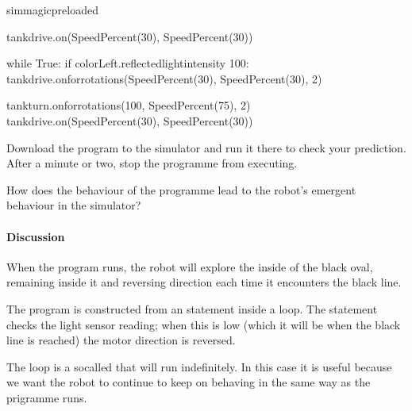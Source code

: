 \documentclass[letterpaper,10pt,english]{sphinxmanual}
\begin{document}

{
\begin{sphinxVerbatim}[commandchars=\\\{\}]
\llap{\color{nbsphinxin}[ ]:\,\hspace{\fboxrule}\hspace{\fboxsep}}\PYGZpc{}\PYGZpc{}sim\PYGZus{}magic\PYGZus{}preloaded

tank\PYGZus{}drive.on(SpeedPercent(30), SpeedPercent(30))

while True:
    if colorLeft.reflected\PYGZus{}light\PYGZus{}intensity \PYGZlt{} 100:
        tank\PYGZus{}drive.on\PYGZus{}for\PYGZus{}rotations(SpeedPercent(\PYGZhy{}30),
                                    SpeedPercent(\PYGZhy{}30), 2)

        tank\PYGZus{}turn.on\PYGZus{}for\PYGZus{}rotations(\PYGZhy{}100, SpeedPercent(75), 2)
        tank\PYGZus{}drive.on(SpeedPercent(30), SpeedPercent(30))

\end{sphinxVerbatim}
}

Download the program to the simulator and run it there to check your prediction. After a minute or two, stop the programme from executing.

How does the behaviour of the programme lead to the robot’s emergent behaviour in the simulator?


\paragraph{Discussion}
\label{\detokenize{content/02_Robot_Lab/Section_00_02:Discussion}}

When the program runs, the robot will explore the inside of the black oval, remaining inside it and reversing direction each time it encounters the black line.

The program is constructed from an  statement inside a  loop. The  statement checks the light sensor reading; when this is low (which it will be when the black line is reached) the motor direction is reversed.

The  loop is a so\sphinxhyphen{}called  that will run indefinitely. In this case it is useful because we want the robot to continue to keep on behaving in the same way as the prigramme runs.
\end{document}
